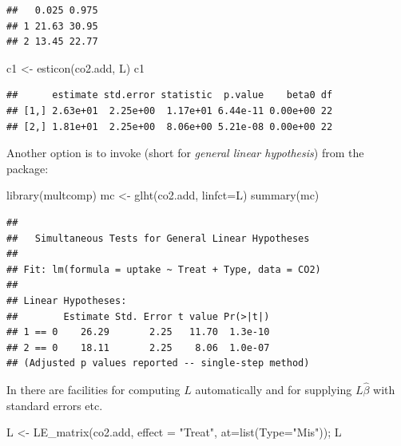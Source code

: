 \documentclass[
]{article}
\newenvironment{Shaded}{\begin{snugshade}}{\end{snugshade}}
\newcommand{\AttributeTok}[1]{\textcolor[rgb]{0.77,0.63,0.00}{#1}}
\newcommand{\FunctionTok}[1]{\textcolor[rgb]{0.00,0.00,0.00}{#1}}
\newcommand{\NormalTok}[1]{#1}
\newcommand{\OtherTok}[1]{\textcolor[rgb]{0.56,0.35,0.01}{#1}}
\newcommand{\StringTok}[1]{\textcolor[rgb]{0.31,0.60,0.02}{#1}}
\begin{document}
\begin{verbatim}
##   0.025 0.975
## 1 21.63 30.95
## 2 13.45 22.77
\end{verbatim}

\begin{Shaded}
\begin{Highlighting}[]
\NormalTok{c1 }\OtherTok{\textless{}{-}} \FunctionTok{esticon}\NormalTok{(co2.add, L)}
\NormalTok{c1}
\end{Highlighting}
\end{Shaded}

\begin{verbatim}
##      estimate std.error statistic  p.value    beta0 df
## [1,] 2.63e+01  2.25e+00  1.17e+01 6.44e-11 0.00e+00 22
## [2,] 1.81e+01  2.25e+00  8.06e+00 5.21e-08 0.00e+00 22
\end{verbatim}

Another option is to invoke  (short for \emph{general linear
hypothesis}) from the  package:

\begin{Shaded}
\begin{Highlighting}[]
\FunctionTok{library}\NormalTok{(multcomp)}
\NormalTok{mc }\OtherTok{\textless{}{-}} \FunctionTok{glht}\NormalTok{(co2.add, }\AttributeTok{linfct=}\NormalTok{L)}
\FunctionTok{summary}\NormalTok{(mc)}
\end{Highlighting}
\end{Shaded}

\begin{verbatim}
## 
##   Simultaneous Tests for General Linear Hypotheses
## 
## Fit: lm(formula = uptake ~ Treat + Type, data = CO2)
## 
## Linear Hypotheses:
##        Estimate Std. Error t value Pr(>|t|)
## 1 == 0    26.29       2.25   11.70  1.3e-10
## 2 == 0    18.11       2.25    8.06  1.0e-07
## (Adjusted p values reported -- single-step method)
\end{verbatim}

In  there are facilities for computing \(L\) automatically and
for supplying \(L\hat\beta\) with standard errors etc.

\begin{Shaded}
\begin{Highlighting}[]
\NormalTok{L }\OtherTok{\textless{}{-}} \FunctionTok{LE\_matrix}\NormalTok{(co2.add, }\AttributeTok{effect =} \StringTok{"Treat"}\NormalTok{, }\AttributeTok{at=}\FunctionTok{list}\NormalTok{(}\AttributeTok{Type=}\StringTok{"Mis"}\NormalTok{)); L}
\end{Highlighting}
\end{Shaded}
\end{document}
